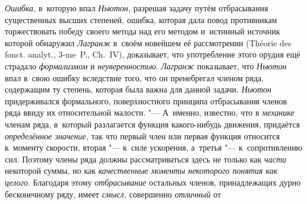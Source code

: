 {\em Ошибка,} в~которую впал {\em Ньютон,} разрешая задачу путём отбрасывания
существенных высших степеней, ошибка, которая дала повод противникам
торжествовать победу своего метода над его методом и~истинный источник которой
обнаружил {\em Лагранж} в~своём новейшем её рассмотрении (Thé\-orie des fonct.
analyt., 3-me~P., Ch.~IV), доказывает, что употребление этого орудия ещё
страдало {\em формализмом} и {\em неуверенностью}. {\em Лагранж} показывает,
что {\em Ньютон} впал в~свою ошибку вследствие того, что он пренебрегал членом
ряда, содержащим ту степень, которая была важна для данной задачи. {\em Ньютон}
придерживался формального, поверхностного принципа отбрасывания членов ряда ввиду
их относительной малости. "--- А~именно, известно, что в {\em механике} членам
ряда, в~который разлагается функция какого-нибудь движения, придаётся
{\em определённое значение,} так что первый член или первая функция относится
к~моменту скорости, вторая "--- к~силе ускорения, а~третья "--- к~сопротивлению
сил. Поэтому члены ряда должны рассматриваться здесь не только как {\em части}
некоторой суммы, но как {\em качественные моменты некоторого понятия как целого}.
Благодаря этому {\em отбрасывание} остальных членов, принадлежащих
дурно бесконечному ряду, имеет {\em смысл,} совершенно {\em отличный} от
